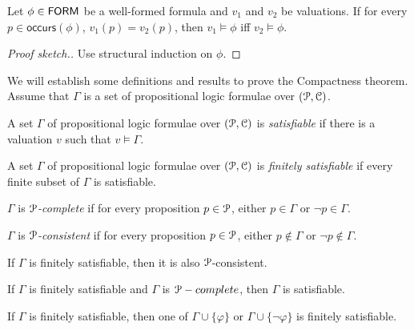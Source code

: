 \documentclass[11pt,usenames, dvipsnames]{article}
\begin{document}
\begin{lemma}
  Let $\phi \in \mathsf{FORM}$ be a well-formed formula and $v_1$ and $v_2$ be valuations. If for every $p \in \mathsf{occurs}(\phi)$, $v_1(p) = v_2(p)$, then $v_1 \models \phi$ iff $v_2 \models \phi$.
\end{lemma}

\begin{proof}[Proof sketch.]
  Use structural induction on $\phi$.
\end{proof}

We will establish some definitions and results to prove the Compactness theorem. Assume that $\Gamma$ is a set of propositional logic formulae over $(\props, \conn)$.

\begin{definition}[Satisfiability]
  A set $\Gamma$ of propositional logic formulae over $(\props, \conn)$ is \emph{satisfiable} if there is a valuation $v$ such that $v \models \Gamma$.
\end{definition}

\begin{definition}
  A set $\Gamma$ of propositional logic formulae over $(\props, \conn)$ is \emph{finitely satisfiable} if every finite subset of $\Gamma$ is satisfiable.
\end{definition}

\begin{definition}
  $\Gamma$ is \emph{$\props$-complete} if for every proposition $p \in \props$, either $p \in \Gamma$ or $\neg p \in \Gamma$.
\end{definition}

\begin{definition}
  $\Gamma$ is \emph{$\props$-consistent} if for every proposition $p \in \props$, either $p \not\in \Gamma$ or $\neg p \not\in \Gamma$.
\end{definition}

\begin{lemma}
  If $\Gamma$ is finitely satisfiable, then it is also $\props$-consistent.
\end{lemma}

\begin{lemma}
  If $\Gamma$ is finitely satisfiable and $\Gamma$ is $\props-complete$, then $\Gamma$ is satisfiable.
\end{lemma}

\begin{lemma}
  If $\Gamma$ is finitely satisfiable, then one of $\Gamma \cup \{\varphi\}$ or $\Gamma \cup \{\neg\varphi\}$ is finitely satisfiable.
\end{lemma}
\end{document}
